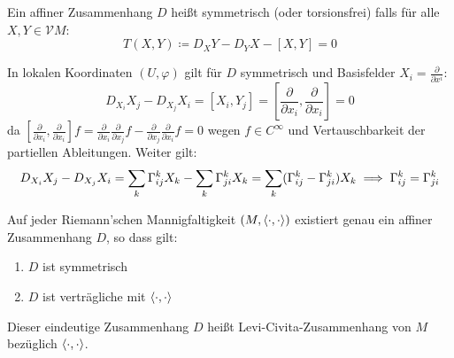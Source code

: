 \documentclass[a4paper,twoside,DIV15,BCOR12mm]{scrbook}
\renewcommand{\da}{\coloneqq}
\newcommand{\VM}{\mathcal V M}
\begin{document}
\begin{definition}
Ein affiner Zusammenhang $D$ heißt symmetrisch (oder torsionsfrei) falls für alle $X,Y\in \VM$:
\[
T(X,Y) \da D_XY - D_YX - [X,Y] = 0
\]
\end{definition}

\begin{bemerkung}
In lokalen Koordinaten $(U,\varphi)$ gilt für $D$ symmetrisch und Basisfelder $X_i = \frac\partial{\partial x^i}$:
\[
D_{X_i} X_j - D_{X_j}X_i  = [X_i,Y_j] = \left[\frac{\partial}{\partial x_i},\frac{\partial}{\partial x_i}\right] = 0
\]
da $\left[\frac{\partial}{\partial x_i},\frac{\partial}{\partial x_i}\right] f = \frac{\partial}{\partial x_i} \frac{\partial}{\partial x_j} f - \frac{\partial}{\partial x_j} \frac{\partial}{\partial x_i} f = 0$ wegen $f\in C^\infty$ und Vertauschbarkeit der partiellen Ableitungen. Weiter gilt:
\[
D_{X_i} X_j - D_{X_j}X_i  = \sum_k \Gamma_{ij}^kX_k - \sum_k \Gamma_{ji}^kX_k = \sum_k( \Gamma_{ij}^k - \Gamma_{ji}^k) X_k \implies \Gamma_{ij}^k = \Gamma_{ji}^k
\]
\end{bemerkung}

\begin{satz}
Auf jeder Riemann’schen Mannigfaltigkeit $(M,\langle\cdot,\cdot\rangle)$ existiert genau ein affiner Zusammenhang $D$, so dass gilt:
\begin{enumerate}
\item $D$ ist symmetrisch
\item $D$ ist verträgliche mit $\langle\cdot,\cdot\rangle$
\end{enumerate}
\end{satz}

Dieser eindeutige Zusammenhang $D$ heißt Levi-Civita-Zusammenhang von $M$ bezüglich $\langle\cdot,\cdot\rangle$.
\end{document}
